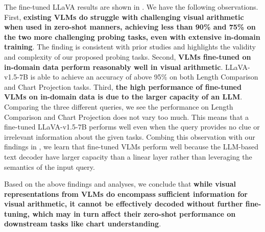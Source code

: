 The fine-tuned LLaVA results are shown in . We have the following observations. First, \textbf{existing VLMs do struggle with challenging visual arithmetic when used in zero-shot manners, achieving less than 90\% and 75\% on the two more challenging probing tasks, even with extensive in-domain training}. %
The finding is consistent with prior studies \cite{Rahmanzadehgervi_2024_blind, wang2024vdlm} and highlights the validity and complexity of our proposed probing tasks. Second, \textbf{VLMs fine-tuned on in-domain data perform reasonably well in visual arithmetic}. LLaVA-v1.5-7B is able to achieve an accuracy of above 95\% on both Length Comparison and Chart Projection tasks. Third, \textbf{the high performance of fine-tuned VLMs on in-domain data is due to the larger capacity of an LLM}. Comparing the three different queries, we see the performance on Length Comparison and Chart Projection does not vary too much. This means that a fine-tuned LLaVA-v1.5-7B performs well even when the query provides no clue or irrelevant information about the given tasks. Combing this observation with our findings in , we learn that fine-tuned VLMs perform well because the LLM-based text decoder have larger capacity than a linear layer %
rather than leveraging the semantics of the input query. 




Based on the above findings and analyses, we conclude that \textbf{while visual representations from VLMs do encompass sufficient information for visual arithmetic, it cannot be effectively decoded without further fine-tuning, which may in turn affect their zero-shot performance on downstream tasks like chart understanding}. %

